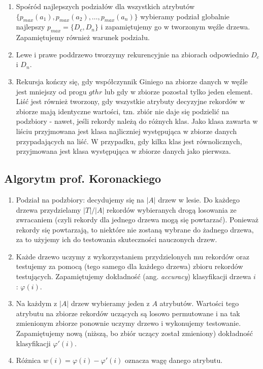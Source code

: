 \documentclass{article}
\begin{document}
\begin{enumerate}
	\item Spośród najlepszych podziałów dla wszystkich atrybutów \\
	$\{ p_{max}(a_1), p_{max}(a_2), \ldots, p_{max}(a_n) \}$ 
	wybieramy podział globalnie najlepszy $p_{max} = \{D_c, D_n\}$ i zapamiętujemy go w tworzonym węźle drzewa. Zapamiętujemy również warunek podziału. 
	\item Lewe i prawe poddrzewo tworzymy rekurencyjnie na zbiorach odpowiednio $D_c$ i $D_n$. 
	\item Rekursja kończy się, gdy współczynnik Giniego na zbiorze danych w węźle jest mniejszy od progu $gthr$ lub gdy w zbiorze pozostał tylko jeden element. Liść jest również tworzony, gdy wszystkie atrybuty decyzyjne rekordów w zbiorze mają identyczne wartości, tzn. zbiór nie daje się podzielić na podzbiory - nawet, jeśli rekordy należą do różnych klas. Jako klasa zawarta w liściu przyjmowana jest klasa najliczniej występująca w zbiorze danych przypadających na liść. W przypadku, gdy kilka klas jest równolicznych, przyjmowana jest klasa występująca w zbiorze danych jako pierwsza. 
\end{enumerate}

\subsection{Algorytm prof. Koronackiego} \label{sec:koronacki}
\begin{enumerate}
	\item Podział na podzbiory: decydujemy się na $\left|A\right|$ drzew w lesie. Do każdego	drzewa przydzielamy $\left|T\right| / \left|A\right|$ rekordów wybieranych drogą losowania ze zwracaniem (czyli rekordy dla jednego drzewa mogą się powtarzać). Ponieważ rekordy się powtarzają, to niektóre nie zostaną wybrane do żadnego drzewa,
	za to użyjemy ich do testowania skuteczności nauczonych drzew. 
	\item Każde drzewo uczymy z wykorzystaniem przydzielonych mu rekordów oraz
	testujemy za pomocą (tego samego dla każdego drzewa) zbioru rekordów
	testujących. Zapamiętujemy dokładność (ang. \emph{accuracy}) klasyfikacji drzewa
	$i$ : $\varphi(i)$. 
	\item Na każdym z $\left|A\right|$ drzew wybieramy jeden z $A$ atrybutów. Wartości tego atrybutu na zbiorze rekordów uczących są losowo permutowane i na tak zmienionym zbiorze ponownie uczymy drzewo i wykonujemy testowanie.	Zapamiętujemy nową (niższą, bo zbiór uczący został zmieniony) dokładność klasyfikacji $\varphi'(i)$. 
	\item Różnica $w(i) = \varphi(i) − \varphi'(i)$ oznacza wagę danego atrybutu.
\end{enumerate}
\end{document}
